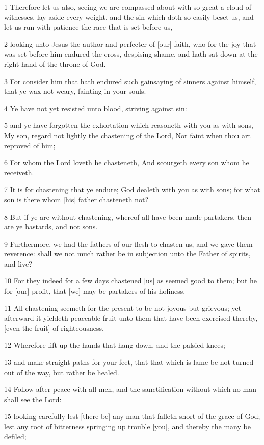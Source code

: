 \par 1 Therefore let us also, seeing we are compassed about with so great a cloud of witnesses, lay aside every weight, and the sin which doth so easily beset us, and let us run with patience the race that is set before us,
\par 2 looking unto Jesus the author and perfecter of [our] faith, who for the joy that was set before him endured the cross, despising shame, and hath sat down at the right hand of the throne of God.
\par 3 For consider him that hath endured such gainsaying of sinners against himself, that ye wax not weary, fainting in your souls.
\par 4 Ye have not yet resisted unto blood, striving against sin:
\par 5 and ye have forgotten the exhortation which reasoneth with you as with sons, My son, regard not lightly the chastening of the Lord, Nor faint when thou art reproved of him;
\par 6 For whom the Lord loveth he chasteneth, And scourgeth every son whom he receiveth.
\par 7 It is for chastening that ye endure; God dealeth with you as with sons; for what son is there whom [his] father chasteneth not?
\par 8 But if ye are without chastening, whereof all have been made partakers, then are ye bastards, and not sons.
\par 9 Furthermore, we had the fathers of our flesh to chasten us, and we gave them reverence: shall we not much rather be in subjection unto the Father of spirits, and live?
\par 10 For they indeed for a few days chastened [us] as seemed good to them; but he for [our] profit, that [we] may be partakers of his holiness.
\par 11 All chastening seemeth for the present to be not joyous but grievous; yet afterward it yieldeth peaceable fruit unto them that have been exercised thereby, [even the fruit] of righteousness.
\par 12 Wherefore lift up the hands that hang down, and the palsied knees;
\par 13 and make straight paths for your feet, that that which is lame be not turned out of the way, but rather be healed.
\par 14 Follow after peace with all men, and the sanctification without which no man shall see the Lord:
\par 15 looking carefully lest [there be] any man that falleth short of the grace of God; lest any root of bitterness springing up trouble [you], and thereby the many be defiled;
